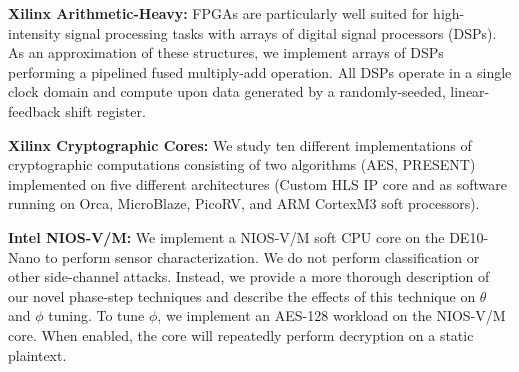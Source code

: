 \textbf{Xilinx Arithmetic-Heavy: }
FPGAs are particularly well suited for high-intensity signal processing tasks with arrays of digital signal processors (DSPs). As an approximation of these structures, we implement arrays of DSPs performing a pipelined fused multiply-add operation. All DSPs operate in a single clock domain and compute upon data generated by a randomly-seeded, linear-feedback shift register.

\textbf{Xilinx Cryptographic Cores:}
We study ten different implementations of cryptographic computations consisting of two algorithms (AES, PRESENT) implemented on five different architectures (Custom HLS IP core and as software running on Orca, MicroBlaze, PicoRV, and ARM CortexM3 soft processors). %

\textbf{Intel NIOS-V/M:}
We implement a NIOS-V/M soft CPU core on the DE10-Nano to perform sensor characterization. We do not perform classification or other side-channel attacks. Instead, we provide a more thorough description of our novel phase-step techniques and describe the effects of this technique on $\theta$ and $\phi$ tuning. To tune $\phi$, we implement an AES-128 workload on the NIOS-V/M core. When enabled, the core will repeatedly perform decryption on a static plaintext.

